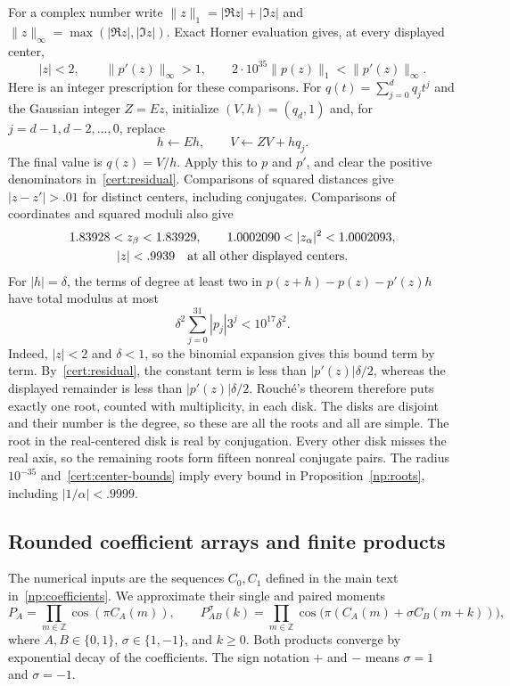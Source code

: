 For a complex number write $\|z\|_1=|\Re z|+|\Im z|$ and
$\|z\|_\infty=\max(|\Re z|,|\Im z|)$.  Exact Horner evaluation gives,
at every displayed center,
\begin{equation}\label{cert:residual}
 |z|<2,\qquad \|p'(z)\|_\infty>1,\qquad
 2\cdot10^{35}\|p(z)\|_1<\|p'(z)\|_\infty.
\end{equation}
Here is an integer prescription for these comparisons.  For
$q(t)=\sum_{j=0}^d q_jt^j$ and the Gaussian integer $Z=Ez$, initialize
$(V,h)=(q_d,1)$ and, for $j=d-1,d-2,\ldots,0$, replace
\[
 h\leftarrow Eh,\qquad V\leftarrow ZV+hq_j.
\]
The final value is $q(z)=V/h$.  Apply this to $p$ and $p'$, and clear
the positive denominators in~\eqref{cert:residual}.  Comparisons of
squared distances give $|z-z'|>.01$ for distinct centers, including
conjugates.  Comparisons of coordinates and squared moduli also give
\begin{equation}\label{cert:center-bounds}
 \begin{gathered}
 1.83928<z_\beta<1.83929,\qquad
 1.0002090<|z_\alpha|^2<1.0002093,\\
 |z|<.9939\quad\hbox{at all other displayed centers}.
 \end{gathered}
\end{equation}
For $|h|=\delta$, the terms of degree at least two in
$p(z+h)-p(z)-p'(z)h$ have total modulus at most
\[
 \delta^2\sum_{j=0}^{31}|p_j|3^j<10^{17}\delta^2.
\]
Indeed, $|z|<2$ and $\delta<1$, so the binomial expansion gives this
bound term by term.  By~\eqref{cert:residual}, the constant term is
less than $|p'(z)|\delta/2$, whereas the displayed remainder is less
than $|p'(z)|\delta/2$.  Rouch\'e's theorem therefore puts exactly one
root, counted with multiplicity, in each disk.  The disks are disjoint
and their number is the degree, so these are all the roots and all are
simple.  The root in the real-centered disk is real by conjugation.
Every other disk misses the real axis, so the remaining roots form
fifteen nonreal conjugate pairs.
The radius $10^{-35}$ and~\eqref{cert:center-bounds} imply every bound
in Proposition~\ref{np:roots}, including $|1/\alpha|<.9999$.

\subsection{Rounded coefficient arrays and finite products}
\label{cert:algorithm}

The numerical inputs are the sequences $C_0,C_1$ defined in the
main text in~\eqref{np:coefficients}.  We approximate their single and paired moments
\begin{equation}\label{cert:exact-moments}
 P_A=\prod_{m\in\mathbb Z}\cos(\pi C_A(m)),\qquad
 P_{AB}^{\sigma}(k)=
 \prod_{m\in\mathbb Z}\cos\bigl(\pi(C_A(m)+\sigma C_B(m+k))\bigr),
\end{equation}
where $A,B\in\{0,1\}$, $\sigma\in\{1,-1\}$, and $k\ge0$.
Both products converge by exponential decay of the coefficients.
The sign notation $+$ and $-$ means $\sigma=1$ and $\sigma=-1$.


